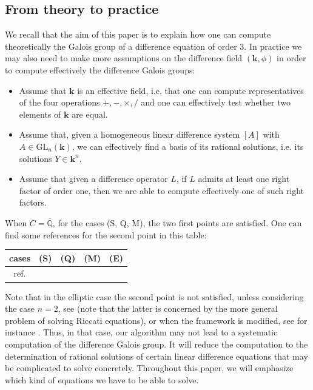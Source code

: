 \documentclass[a4paper,11pt]{amsart}
\newcommand{\GL}{\operatorname{GL}}
\def\k{\mathbf{k}}
\def\GL{\mathrm{GL}}
\def\Q{\mathbb{Q}}
\begin{document}
\subsection{From theory to practice}
\label{sec:theoryPractice}
We recall that the aim of this paper is to explain how one can compute theoretically the Galois group of a difference equation of order $3$.
In practice we may also need to make more assumptions on the difference field $(\k,\phi)$ in order to compute effectively the difference Galois groups:
\begin{itemize}
\item
Assume that $\mathbf{k}$ is an effective field,
i.e. that one can compute representatives of the four operations $+,-,\times,/$ and one can effectively test whether two elements of $\mathbf{k}$ are equal.  
\item 
Assume that, given a homogeneous linear difference system $[A]$ with $A\in \GL_n(\mathbf{k})$, we can effectively find a 
basis of its rational solutions, i.e. its solutions $Y\in \mathbf{k}^n$.
\item Assume that given a difference operator $L$, if $L$ admits at least one right factor of order one, then we are able to compute effectively one of such right factors.
\end{itemize}


When $C=\overline{\Q}$,  for the cases (S, Q, M), the  two first points are satisfied. One can find some references for the second point in this table:
\medskip
\begin{center}
\begin{tabular}{|c|c|c|c|c|}
\hline
    cases &  (S) & (Q) & (M)&(E) \\
\hline 
    ref. & \cite{Abr95,AB98,vanHoeij1998,AB2001} & \cite{Abr95,AB2001,Abr02} & \cite{CDDM18} & \cite{dreyfus2015galois,combot2022hyperexponential}\\
\hline
\end{tabular}
\end{center}
\medskip 

Note that in the elliptic case the second  point is not satisfied, unless considering the case $n=2$, see \cite{dreyfus2015galois} (note that the latter is concerned by the more general problem of solving Riccati equations), or when the framework is modified,  see for instance \cite{combot2022hyperexponential}.  Thus, in that case, our algorithm may not lead to a systematic computation of the difference Galois group. It will reduce the computation to the determination of rational solutions of certain linear difference equations that may be complicated to solve concretely.
Throughout this paper, we will emphasize which kind of equations we have to be able to solve. 
\end{document}
